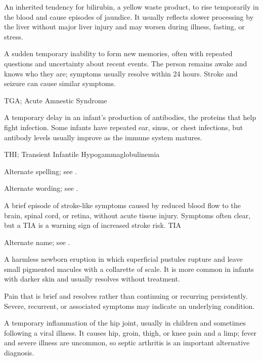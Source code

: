  An inherited tendency for bilirubin, a yellow waste product, to rise temporarily in the blood and cause episodes of jaundice. It usually reflects slower processing by the liver without major liver injury and may worsen during illness, fasting, or stress.

 A sudden temporary inability to form new memories, often with repeated questions and uncertainty about recent events. The person remains awake and knows who they are; symptoms usually resolve within 24 hours. Stroke and seizure can cause similar symptoms.

\synonyms
TGA; Acute Amnestic Syndrome

 A temporary delay in an infant’s production of antibodies, the proteins that help fight infection. Some infants have repeated ear, sinus, or chest infections, but antibody levels usually improve as the immune system matures.

\synonyms
THI; Transient Infantile Hypogammaglobulinemia

 Alternate spelling; see .

 Alternate wording; see .

 A brief episode of stroke-like symptoms caused by reduced blood flow to the brain, spinal cord, or retina, without acute tissue injury. Symptoms often clear, but a TIA is a warning sign of increased stroke risk.
\synonyms
TIA

 Alternate name; see .

 A harmless newborn eruption in which superficial pustules rupture and leave small pigmented macules with a collarette of scale. It is more common in infants with darker skin and usually resolves without treatment.

 Pain that is brief and resolves rather than continuing or recurring persistently. Severe, recurrent, or associated symptoms may indicate an underlying condition.

 A temporary inflammation of the hip joint, usually in children and sometimes following a viral illness. It causes hip, groin, thigh, or knee pain and a limp; fever and severe illness are uncommon, so septic arthritis is an important alternative diagnosis.


